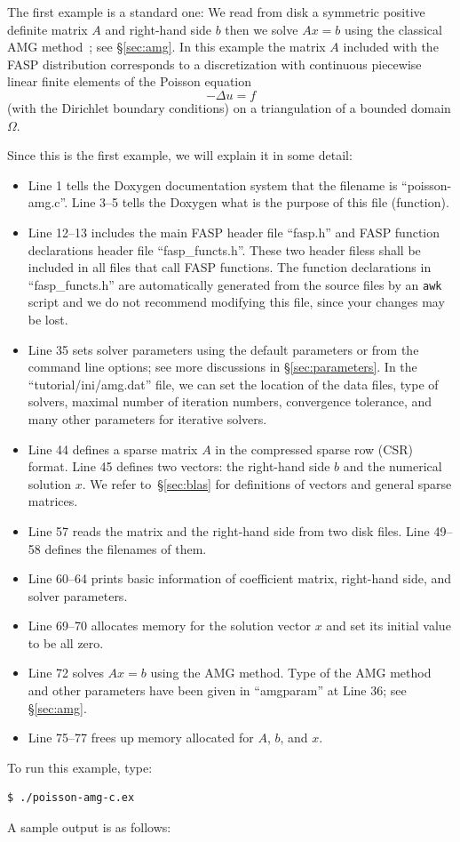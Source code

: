 \documentclass[11pt]{memoir}
\begin{document}
The first example is a standard one: We read from disk a symmetric
positive definite matrix $A$ and right-hand side $b$ then we solve
$Ax=b$ using the classical AMG
method~\cite{Brandt.BrandtMcCormick.1982uq,Ruge.RugeStuben.1985ij,Ruge.RugeStuben.1987bs};
see \S\ref{sec:amg}. In this example the matrix $A$ included with the
FASP distribution corresponds to a discretization with continuous
piecewise linear finite elements of the Poisson equation
$$-\Delta u = f$$ (with the Dirichlet boundary conditions) on a
triangulation of a bounded domain $\Omega$.
%

%
Since this is the first example, we will explain it in some detail:
\begin{itemize}
%
\item Line 1 tells the Doxygen documentation system that the filename
  is ``poisson-amg.c''. Line 3--5 tells the Doxygen what is the
  purpose of this file (function).
%
\item Line 12--13 includes the main FASP header file ``fasp.h'' and
  FASP function declarations header file ``fasp\_functs.h''. These two
  header filess shall be included in all files that call FASP
  functions. The function declarations in ``fasp\_functs.h'' are
  automatically generated from the source files by an \verb|awk|
  script and we do not recommend modifying this file, since your
  changes may be lost.
%
\item Line 35 sets solver parameters using the default parameters or
  from the command line options; see more discussions in
  \S\ref{sec:parameters}. In the ``tutorial/ini/amg.dat'' file, we can
  set the location of the data files, type of solvers, maximal number
  of iteration numbers, convergence tolerance, and many other
  parameters for iterative solvers.
%
\item Line 44 defines a sparse matrix $A$ in the compressed sparse row
  (CSR) format. Line 45 defines two vectors: the right-hand side $b$
  and the numerical solution $x$. We refer to~\S\ref{sec:blas} for
  definitions of vectors and general sparse matrices.
%
\item Line 57 reads the matrix and the right-hand side from two disk
  files. Line 49--58 defines the filenames of them.
%
\item Line 60--64 prints basic information of coefficient matrix,
  right-hand side, and solver parameters.
%
\item Line 69--70 allocates memory for the solution vector $x$ and set
  its initial value to be all zero.
%
\item Line 72 solves $Ax=b$ using the AMG method. Type of the AMG
  method and other parameters have been given in ``amgparam'' at Line
  36; see \S\ref{sec:amg}.
%
\item Line 75--77 frees up memory allocated for $A$, $b$, and $x$.
\end{itemize}
%
To run this example, type:
%
\begin{lstlisting}[numbers=none]
$ ./poisson-amg-c.ex
\end{lstlisting}
%
A sample output is as follows:
%

\end{document}
